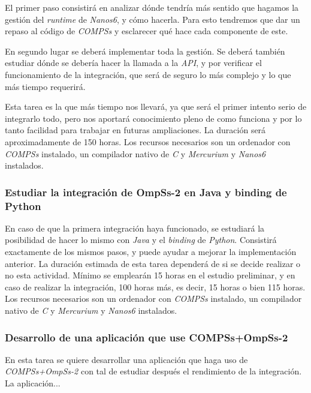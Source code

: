 El primer paso consistirá en analizar dónde tendría más sentido que hagamos la gestión del \textit{runtime} de \textit{Nanos6}, y cómo hacerla. Para esto tendremos que dar un repaso al código de \textit{COMPSs} y esclarecer qué hace cada componente de este. 
\par\bigksip

En segundo lugar se deberá implementar toda la gestión. Se deberá también estudiar dónde se debería hacer la llamada a la \textit{API}, y por verificar el funcionamiento de la integración, que será de seguro lo más complejo y lo que más tiempo requerirá.
\par\bigskip

Esta tarea es la que más tiempo nos llevará, ya que será el primer intento serio de integrarlo todo, pero nos aportará conocimiento pleno de como funciona y por lo tanto facilidad para trabajar en futuras ampliaciones. La duración será aproximadamente de 150 horas. Los recursos necesarios son un ordenador con \textit{COMPSs} instalado, un compilador nativo de \textit{C} y \textit{Mercurium} y \textit{Nanos6} instalados.

\subsubsection{Estudiar la integración de OmpSs-2 en Java y binding de Python}

En caso de que la primera integración haya funcionado, se estudiará la posibilidad de hacer lo mismo con \textit{Java} y el \textit{binding} de \textit{Python}. Consistirá exactamente de los mismos pasos, y puede ayudar a mejorar la implementación anterior. La duración estimada de esta tarea dependerá de si se decide realizar o no esta actividad. Mínimo se emplearán 15 horas en el estudio preliminar, y en caso de realizar la integración, 100 horas más, es decir, 15 horas o bien 115 horas. Los recursos necesarios son un ordenador con \textit{COMPSs} instalado, un compilador nativo de \textit{C} y \textit{Mercurium} y \textit{Nanos6} instalados.

\subsubsection{Desarrollo de una aplicación que use COMPSs+OmpSs-2}

En esta tarea se quiere desarrollar una aplicación que haga uso de \textit{COMPSs+OmpSs-2} con tal de estudiar después el rendimiento de la integración. La aplicación... 

